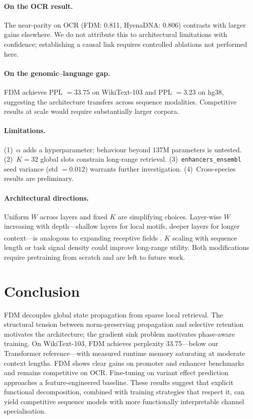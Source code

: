 \documentclass{article}
\newcommand{\citenum}[1]{%
  \textsuperscript{\rmfamily\upshape[#1]}}
\begin{document}
\paragraph{On the OCR result.}
The near-parity on OCR (FDM: 0.811, HyenaDNA: 0.806) contrasts with
larger gains elsewhere.
We do not attribute this to architectural limitations with confidence;
establishing a causal link requires controlled ablations not performed here.

\paragraph{On the genomic--language gap.}
FDM achieves PPL $= 33.75$ on WikiText-103 and PPL $= 3.23$ on hg38,
suggesting the architecture transfers across sequence modalities.
Competitive results at scale would require substantially larger corpora.

\paragraph{Limitations.}
(1)~$\alpha$ adds a hyperparameter; behaviour beyond 137M parameters is
untested.
(2)~$K = 32$ global slots constrain long-range retrieval.
(3)~\texttt{enhancers\_ensembl} seed variance (std $= 0.012$) warrants
further investigation.
(4)~Cross-species results are preliminary.

\paragraph{Architectural directions.}
Uniform $W$ across layers and fixed $K$ are simplifying choices.
Layer-wise $W$ increasing with depth---shallow layers for local motifs,
deeper layers for longer context---is analogous to expanding receptive
fields\citenum{21}.
$K$ scaling with sequence length or task signal density could improve
long-range utility.
Both modifications require pretraining from scratch and are left to
future work.

\section{Conclusion}

FDM decouples global state propagation from sparse local retrieval.
The structural tension between norm-preserving propagation and selective
retention motivates the architecture; the gradient sink problem motivates
phase-aware training.
On WikiText-103, FDM achieves perplexity 33.75---below our Transformer
reference---with measured runtime memory saturating at moderate context
lengths.
FDM shows clear gains on promoter and enhancer benchmarks and remains
competitive on OCR.
Fine-tuning on variant effect prediction approaches a feature-engineered
baseline.
These results suggest that explicit functional decomposition, combined
with training strategies that respect it, can yield competitive sequence
models with more functionally interpretable channel specialisation.
\end{document}
